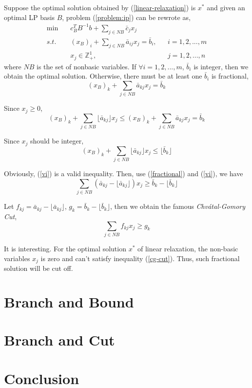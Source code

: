 \documentclass{article}
\begin{document}
\noindent \qquad Suppose the optimal solution obtained by (\ref{linear-relaxation}) is $x^*$ and given an optimal LP basis $B$, problem (\ref{problem:ip}) can be rewrote as,
\begin{align}
\min \quad & c_B^T B^{-1} b + \sum_{j \in NB} \bar{c}_jx_j \\
s.t. \quad & (x_B)_i + \sum_{j \in NB} \bar{a}_{ij}x_j = \bar{b}_i, && i = 1, 2, ..., m \\
& x_j \in \mathbb{Z}_+^1, && j = 1, 2, ..., n 
\end{align}
where $NB$ is the set of nonbasic variables. If $\forall i = 1, 2, ..., m$,  $\bar{b}_i$ is integer, then we obtain the optimal solution. Otherwise, there must be at least one $\bar{b}_i$ is fractional,
\begin{equation}
(x_B)_k + \sum_{j \in NB} \bar{a}_{kj}x_j = \bar{b}_k \label{fractional}
\end{equation}

\noindent \qquad Since $x_j \geq 0$,
\begin{equation}
(x_B)_k + \sum_{j \in NB} \lfloor \bar{a}_{kj} \rfloor x_j \leq (x_B)_k + \sum_{j \in NB} \bar{a}_{kj}x_j  = \bar{b}_k
\end{equation}

\noindent \qquad Since $x_j$ should be integer,
\begin{equation}
(x_B)_k + \sum_{j \in NB} \lfloor \bar{a}_{kj} \rfloor x_j \leq \lfloor \bar{b}_k  \rfloor \label{vi}
\end{equation}

\noindent \qquad Obviously, (\ref{vi}) is a valid inequality. Then, use (\ref{fractional}) and (\ref{vi}), we have
\begin{equation}
\sum_{j \in NB} (\bar{a}_{kj} - \lfloor \bar{a}_{kj} \rfloor) x_j \geq \bar{b}_k -  \lfloor \bar{b}_k  \rfloor \label{sub}
\end{equation}

\noindent \qquad Let $f_{kj} = \bar{a}_{kj} - \lfloor \bar{a}_{kj} \rfloor$, $g_k =  \bar{b}_k -  \lfloor \bar{b}_k\rfloor $, then we obtain the famous \textit{Chv\'atal-Gomory Cut},
\begin{equation}
\sum_{j \in NB} f_{kj} x_j \geq g_k \label{cg-cut}
\end{equation}

\noindent \qquad It is interesting. For the optimal solution $x^*$ of linear relaxation, the non-basic variables $x_j$ is zero and can't satisfy inequality (\ref{cg-cut}). Thus, such fractional solution will be cut off.

\section{Branch and Bound}


\section{Branch and Cut}


\section{Conclusion}


% 
% 
\end{document}
